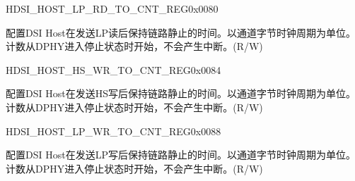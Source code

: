     
    \begin{register}{H}{DSI\_HOST\_LP\_RD\_TO\_CNT\_REG}{0x0080}\label{regdesc:DSIHOSTLPRDTOCNTREG}
    \regnewline%
    \begin{regdesc}\begin{reglist}
    \label{fielddesc:DSIHOSTLPRDTOCNT}\item [DSI\_HOST\_LP\_RD\_TO\_CNT] 配置DSI Host在发送LP读后保持链路静止的时间。以通道字节时钟周期为单位。计数从DPHY进入停止状态时开始，不会产生中断。(R/W)
    \end{reglist}\end{regdesc}
    \end{register}
    
    
    \begin{register}{H}{DSI\_HOST\_HS\_WR\_TO\_CNT\_REG}{0x0084}\label{regdesc:DSIHOSTHSWRTOCNTREG}
    \regnewline%
    \begin{regdesc}\begin{reglist}
    \label{fielddesc:DSIHOSTHSWRTOCNT}\item [DSI\_HOST\_HS\_WR\_TO\_CNT] 配置DSI Host在发送HS写后保持链路静止的时间。以通道字节时钟周期为单位。计数从DPHY进入停止状态时开始，不会产生中断。(R/W)
    \end{reglist}\end{regdesc}
    \end{register}
    
    
    \begin{register}{H}{DSI\_HOST\_LP\_WR\_TO\_CNT\_REG}{0x0088}\label{regdesc:DSIHOSTLPWRTOCNTREG}
    \regnewline%
    \begin{regdesc}\begin{reglist}
    \label{fielddesc:DSIHOSTLPWRTOCNT}\item [DSI\_HOST\_LP\_WR\_TO\_CNT] 配置DSI Host在发送LP写后保持链路静止的时间。以通道字节时钟周期为单位。计数从DPHY进入停止状态时开始，不会产生中断。(R/W)
    \end{reglist}\end{regdesc}
    \end{register}
    
